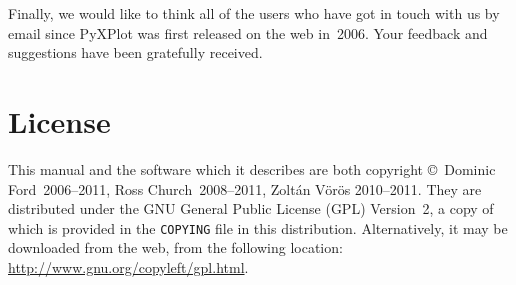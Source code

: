 Finally, we would like to think all of the users who have got in touch with us
by email since PyXPlot was first released on the web in~2006. Your feedback and
suggestions have been gratefully received.

\section{License}

This manual and the software which it describes are both copyright \copyright\
Dominic Ford~2006--2011, Ross Church~2008--2011, Zolt\'an V\"or\"os 2010--2011.
They are distributed under the GNU General Public License (GPL) Version~2, a
copy of which is provided in the {\tt COPYING} file in this
distribution. Alternatively, it
may be downloaded from the web, from the following location:\\
\url{http://www.gnu.org/copyleft/gpl.html}.

